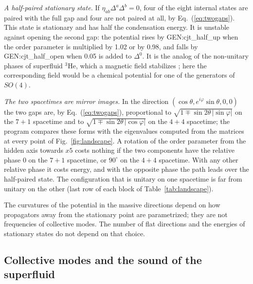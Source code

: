 \emph{A half-paired stationary state.} If $\eta_{ab}\Delta^a\Delta^b=0$, four of the eight internal
states are paired with the full gap and four are not paired at all, by Eq.~(\ref{eq:twogaps}). This
state is stationary and has half the condensation energy. It is unstable against opening the second
gap: the potential rises by {{GEN:cjt_half_up}} when the order parameter is multiplied by 1.02 or by
0.98, and falls by {{GEN:cjt_half_open}} when 0.05 is added to $\Delta^0$. It is the analog of the
non-unitary phases of superfluid $^3$He, which a magnetic field stabilizes \cite{Leggett1975}; here
the corresponding field would be a chemical potential for one of the generators of $SO(4)$.

\emph{The two spacetimes are mirror images.} In the direction
$(\cos\theta,e^{i\varphi}\sin\theta,0,0)$ the two gaps are, by Eq.~(\ref{eq:twogaps}), proportional to
$\sqrt{1\mp\sin2\theta\,|\sin\varphi|}$ on the $7+1$ spacetime and to
$\sqrt{1\mp\sin2\theta\,|\cos\varphi|}$ on the $4+4$ spacetime; the program compares these forms with
the eigenvalues computed from the matrices at every point of Fig.~\ref{fig:landscape}. A rotation of
the order parameter from the hidden axis towards $x5$ costs nothing if the two components have the
relative phase 0 on the $7+1$ spacetime, or $90^\circ$ on the $4+4$ spacetime. With any other
relative phase it costs energy, and with the opposite phase the path leads over the half-paired
state. The configuration that is unitary on one spacetime is far from unitary on the other (last row
of each block of Table~\ref{tab:landscape}).

The curvatures of the potential in the massive directions depend on how propagators away from the
stationary point are parametrized; they are not frequencies of collective modes. The number of flat
directions and the energies of stationary states do not depend on that choice.

\subsection{Collective modes and the sound of the superfluid}
\label{sec:sound}

